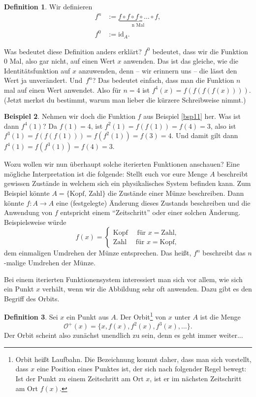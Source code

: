 \documentclass[a4paper,ngerman,12pt]{zirkelblatt1415}
\theoremstyle{definition}
\newtheorem{definition}{Definition}
\newtheorem{beispiel}[definition]{Beispiel}
\theoremstyle{remark}
\newcommand{\lra}{\longrightarrow}
\newcommand{\id}{\text{id}}
\begin{document}
\begin{definition}
Wir definieren
\begin{align*}
f^n &:= \underbrace{f \circ f \circ f \circ \ldots \circ f}_{\text{n Mal}}, \\
f^0 &:= \id_A.
\end{align*} 
\end{definition}
Was bedeutet diese Definition anders erklärt? $f^0$ bedeutet, dass wir die Funktion $0$ Mal, also gar nicht, auf einen Wert $x$ anwenden.
Das ist das gleiche, wie die Identitätsfunktion auf $x$ anzuwenden, denn -- wir erinnern uns -- die lässt den Wert ja unverändert.
Und~$f^n$? Das bedeutet einfach, dass man die Funktion $n$ mal auf einen Wert anwendet. Also für $n = 4$ 
ist $f^4 (x) = f(f(f(f(x))))$. (Jetzt merkst du bestimmt, warum man lieber die kürzere Schreibweise nimmt.)

\begin{beispiel}
 Nehmen wir doch die Funktion $f$ aus Beispiel \ref{bsp11} her.
 Was ist dann $f^4(1)$? Da $f(1) = 4$, ist $f^2(1) = f(f(1)) = f(4) = 3$, also ist $f^3(1) = f(f(f(1))) = f(f^2(1)) = f(3) = 4$.
 Und damit gilt dann $f^4(1) = f(f^3(1)) = f(4) = 3$.
\end{beispiel}


Wozu wollen wir nun überhaupt solche iterierten Funktionen anschauen? 
Eine mögliche Interpretation ist die folgende: 
Stellt euch vor eure Menge $A$ beschreibt gewissen Zustände in welchem sich ein physikalisches System befinden kann. 
Zum Beispiel könnte $A=\{\text{Kopf, Zahl}\}$ die Zustände einer Münze beschreiben. 
Dann könnte $f:A\lra A$ eine (festgelegte) Änderung dieses Zustands beschreiben und die Anwendung von $f$ entspricht einem "`Zeitschritt"' oder einer solchen Änderung. 
Beispielsweise würde
\begin{equation*}
  f(x)=\begin{cases} \text{Kopf} \quad \text{ für } x=\text{Zahl},\\ \text{Zahl} \quad \text{ für }x=\text{Kopf},\end{cases}
\end{equation*}
dem einmaligen Umdrehen der Münze entsprechen. Das heißt, $f^n$ beschreibt das $n$-malige Umdrehen der Münze.

Bei einem iterierten Funktionensystem interessiert man sich vor allem, wie sich ein Punkt $x$ verhält, wenn wir die Abbildung sehr oft anwenden. 
Dazu gibt es den Begriff des Orbits.

\begin{definition}
Sei $x$ ein Punkt aus $A$. Der Orbit\footnote{Orbit heißt Laufbahn. Die Bezeichnung kommt daher, dass man sich vorstellt, 
dass $x$ eine Position eines Punktes ist, der sich nach folgender Regel bewegt: 
Ist der Punkt zu einem Zeitschritt am Ort $x$, ist er im nächsten Zeitschritt am Ort $f(x)$.} 
von $x$ unter $A$ ist die Menge
\[
\mathcal{O}^+(x) = \{x, f(x), f^2(x), f^3(x) ,\ldots\}.
\]
Der Orbit scheint also zunächst unendlich zu sein, denn es geht immer weiter... 
\end{definition}
\end{document}
